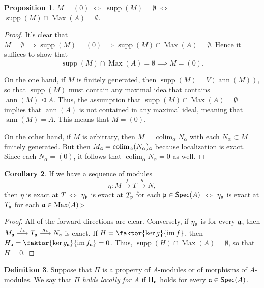 \documentclass[10pt,letterpaper,cm]{nupset}
\theoremstyle{definition}
\newtheorem{definition}{Definition}[subsection]
\theoremstyle{theorem}
\newtheorem{prop}[definition]{Proposition}
\newtheorem{corollary}[definition]{Corollary}
\theoremstyle{remark}
\newcommand{\1}{\mathbf{1}}
\newcommand{\0}{\vec 0}
\DeclareMathOperator{\ann}{ann}
\DeclareMathOperator{\im}{im}
\DeclareMathOperator{\colim}{colim}
\DeclareMathOperator{\Max}{Max}
\DeclareMathOperator{\supp}{supp}
\begin{document}
\begin{prop}
$M= (0)$ $\iff$ $\supp(M) = \emptyset$ $\iff$ $\supp(M) \cap \Max(A) = \emptyset$.
\end{prop}
\begin{proof}
It's clear that $M = \emptyset \implies \supp(M) = (0) \implies \supp(M) \cap \Max(A) = \emptyset$. Hence it suffices to show that  $$\supp(M) \cap \Max(A) = \emptyset \implies M= (0).$$ 

On the one hand, if $M$ is finitely generated, then $\supp(M) = V(\ann(M))$, so that $\supp(M)$ must contain any maximal idea that contains $\ann(M) \unlhd A$. Thus, the assumption that $\supp(M) \cap \Max(A) = \emptyset$ implies that $\ann(A)$ is not contained in any maximal ideal, meaning that $\ann(M) = A$. This means that $M= (0)$. 

On the other hand, if $M$ is arbitrary, then $M = \colim_{\alpha} N_{\alpha}$ with each $N_{\alpha} \subset M$ finitely generated. But then $M_{\frak{a}} = \colim_{\alpha} (N_{\alpha})_{\frak{a}}$ because localization is exact.  Since each $N_{\alpha} = (0)$, it follows that $\colim_{\alpha} N_{\alpha} =0$ as well. 
\end{proof}


\begin{corollary}
If we have a sequence of modules $$\eta: M \overset{f}{\longrightarrow} T \overset{g}{\longrightarrow} N,$$ then $\eta$ is exact at $T$ $\iff$ $\eta_{\frak{p}}$ is exact at $T_{\frak{p}}$ for each $\frak{p} \in \mathsf{Spec}(A)$ $\iff$ $\eta_{\frak{a}}$ is exact at $T_{\frak{a}}$ for each $\frak{a} \in \Max(A)$>  
\end{corollary}
\begin{proof}
All of the forward directions are clear. Conversely, if $\eta_{\frak{a}}$ is for every $\frak{a}$, then $M_{\frak{a}} \overset{f_{\frak{a}}}{\longrightarrow} T_{\frak{a}} \overset{g_{\frak{a}}}{\longrightarrow} N_{\frak{a}}$ is exact. If $H = \faktor{\ker{g}}{\im{f}}$, then $H_{\frak{a}} = \faktor{\ker{g_{\frak{a}}}}{\im{f_{\frak{a}}}} = 0$. Thus, $\supp(H) \cap \Max(A) = \emptyset$, so that $H= 0$. 
\end{proof}

\begin{definition}
Suppose that $\Pi$ is a property of $A$-modules or of morphisms of $A$-modules. We say that \textit{$\Pi$ holds locally for $A$} if $\Pi_{\frak{a}}$ holds for every $\frak{a} \in \mathsf{Spec}(A)$.  
\end{definition}
\end{document}
